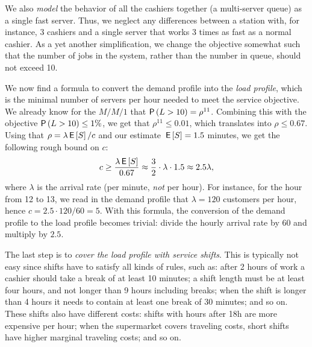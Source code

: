 We also \emph{model} the behavior of all the cashiers together (a multi-server queue) as a single fast server. Thus, we neglect any differences between a station with, for instance, 3 cashiers and a
single server that works 3 times as fast as a normal cashier.  As a yet
another simplification, we change the objective somewhat such that the
number of jobs in the system, rather than the number in queue, should not exceed 10. 

We now find a formula to convert the demand profile into the \emph{load profile}, which is the minimal number of servers per hour needed to meet the service objective. We already know for the $M/M/1$ that $\P{L>10}=\rho^{11}$.  Combining this with the objective $\P{L>10}\leq 1\%$, we get that $\rho^{11}\leq 0.01$, which  translates into $\rho \leq 0.67$. Using that $\rho = \lambda \,\mathsf{E}\left[S\right]/c$ and our estimate $\,\mathsf{E}\left[S\right]=1.5$ minutes,  we get  the following rough bound on $c$:
\begin{equation*}
c \geq \frac{\lambda \,\mathsf{E}\left[S\right]}{0.67} \approx \frac{3}2 \cdot \lambda \cdot 1.5  \approx 2.5 \lambda,
\end{equation*}
where $\lambda$ is the arrival rate (per minute, \emph{not} per hour).
For instance, for the hour from 12 to 13, we read in  the demand profile that $\lambda= 120$ customers per hour, hence $c=2.5 \cdot 120/60 = 5$. With this formula, the conversion of the demand profile to the load profile becomes trivial: divide the hourly arrival rate by $60$ and multiply by
$2.5$.

The last step is to \emph{cover the load profile with service shifts}. This
is typically not easy since shifts have to satisfy all kinds of rules,
such as: after 2 hours of work a cashier should take a break of at least
10 minutes; a shift length must be at least four hours, and not longer
than 9 hours including breaks; when the shift is longer than 4 hours
it needs to contain at least one break of 30 minutes; and so on. These
shifts also have different costs: shifts with hours after 18h
are more expensive per hour; when the supermarket covers traveling
costs, short shifts have higher marginal traveling costs; and so on.

